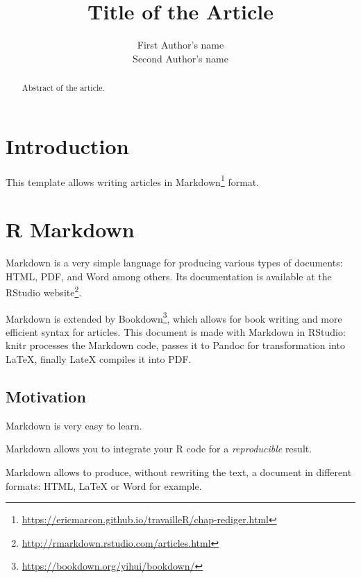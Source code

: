 \documentclass[fleqn,]{article} %
\title{Title of the Article} %
\author{
First Author's name\\ Second Author's name
} %
\begin{document}

\maketitle %

\begin{abstract}
Abstract of the article.
\end{abstract}


\thispagestyle{empty} %


\section{Introduction}\label{introduction}

This template allows writing articles in Markdown\footnote{\url{https://ericmarcon.github.io/travailleR/chap-rediger.html}} format.

\section{R Markdown}\label{markdown}

Markdown is a very simple language for producing various types of documents: HTML, PDF, and Word among others.
Its documentation is available at the RStudio website\footnote{\url{http://rmarkdown.rstudio.com/articles.html}}.

Markdown is extended by Bookdown\footnote{\url{https://bookdown.org/yihui/bookdown/}}, which allows for book writing and more efficient syntax for articles.
This document is made with Markdown in RStudio: knitr processes the Markdown code, passes it to Pandoc for transformation into LaTeX, finally LateX compiles it into PDF.

\subsection{Motivation}\label{motivation}

Markdown is very easy to learn.

Markdown allows you to integrate your R code for a \emph{reproducible} result.

Markdown allows to produce, without rewriting the text, a document in different formats: HTML, LaTeX or Word for example.
\end{document}
